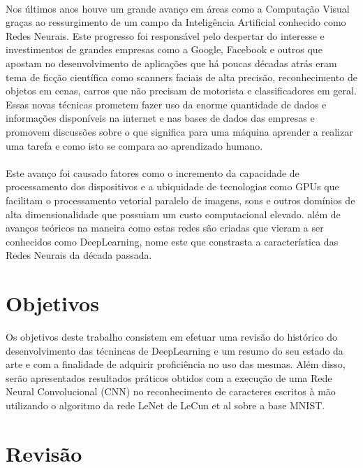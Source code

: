 \documentclass[cic,tc]{iiufrgs}
\begin{document}
\paragraph{} Nos últimos anos houve um grande avanço em áreas como a Computação
Visual graças ao ressurgimento de um campo da Inteligência Artificial conhecido
como Redes Neurais. Este progresso foi responsável pelo despertar do interesse
e investimentos de grandes empresas como a Google, Facebook e outros que
apostam no desenvolvimento de aplicações que há poucas décadas atrás eram tema
de ficção científica como scanners faciais de alta precisão, reconhecimento de
objetos em cenas, carros que não precisam de motorista e classificadores em
geral. Essas novas técnicas prometem fazer uso da enorme quantidade de dados e
informações disponíveis na internet e nas bases de dados das empresas e
promovem discussões sobre o que significa para uma máquina aprender a realizar
uma tarefa e como isto se compara ao aprendizado humano.

\paragraph{} Este avanço foi causado fatores como o incremento da capacidade de
processamento dos dispositivos e a ubiquidade de tecnologias como GPUs que
facilitam o processamento vetorial paralelo de imagens, sons e outros domínios
de alta dimensionalidade que possuiam um custo computacional elevado. além de
avanços teóricos na maneira como estas redes são criadas que vieram a ser
conhecidos como DeepLearning, nome este que constrasta a característica das
Redes Neurais da década passada.

\section{Objetivos}

  Os objetivos deste trabalho consistem em efetuar uma revisão do histórico do
  desenvolvimento das técnincas de DeepLearning e um resumo do seu estado da
  arte e com a finalidade de adquirir proficiência no uso das mesmas.  Além
  disso, serão apresentados resultados práticos obtidos com a execução de uma
  Rede Neural Convolucional (CNN) no reconhecimento de caracteres escritos à
  mão utilizando o algoritmo da rede LeNet de LeCun et al sobre a base MNIST.\@

\section{Revisão}
\end{document}
